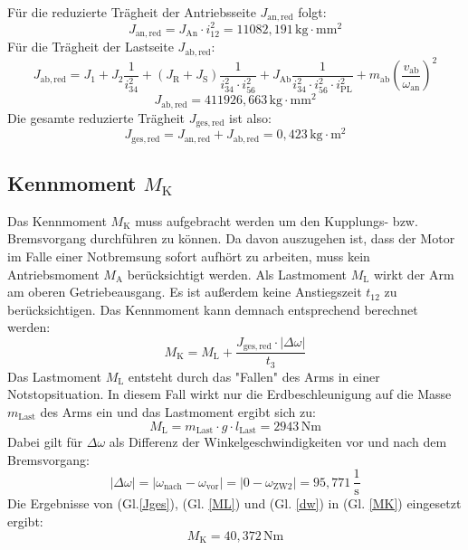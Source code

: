 \noindent
Für die reduzierte Trägheit der Antriebsseite $J_\mathrm{an,red}$ folgt: 
\begin{equation}
    J_\mathrm{an,red} = J_\mathrm{An}\cdot i_\mathrm{12}^2 = 11082,191\,\mathrm{kg\cdot mm^2}
\end{equation}
Für die Trägheit der Lastseite $J_\mathrm{ab,red}$:
\begin{equation}
    J_\mathrm{ab,red} = J_\mathrm{1} + J_\mathrm{2}\frac{1}{i_\mathrm{34}^2} + (J_\mathrm{R}+J_\mathrm{S})\frac{1}{i_\mathrm{34}^2 \cdot i_\mathrm{56}^2} + J_\mathrm{Ab}\frac{1}{i_\mathrm{34}^2 \cdot i_\mathrm{56}^2 \cdot i_\mathrm{PL}^2} + m_\mathrm{ab} \left( \frac{v_\mathrm{ab}}{\omega_\mathrm{an}} \right)^2
\end{equation}
\begin{equation*}
    J_\mathrm{ab,red} = 411926,663\,\mathrm{kg\cdot mm^2}
\end{equation*}
Die gesamte reduzierte Trägheit $J_\mathrm{ges,red}$ ist also:
\begin{equation} \label{Jges}
    J_\mathrm{ges,red} = J_\mathrm{an,red} + J_\mathrm{ab,red} = 0,423\,\mathrm{kg\cdot m^2}
\end{equation}

\subsection{Kennmoment $M_\mathrm{K}$}
Das Kennmoment $M_\mathrm{K}$ muss aufgebracht werden um den Kupplungs- bzw. Bremsvorgang durchführen zu können. Da davon auszugehen ist, dass der Motor im Falle einer Notbremsung sofort aufhört zu arbeiten, muss kein Antriebsmoment $M_\mathrm{A}$ berücksichtigt werden. Als Lastmoment $M_\mathrm{L}$ wirkt der Arm am oberen Getriebeausgang. Es ist außerdem keine Anstiegszeit $t_\mathrm{12}$ zu berücksichtigen. Das Kennmoment kann demnach entsprechend \cite[S. 13, Gl. 1]{VDI2241-1} berechnet werden:
\begin{equation} \label{MK}
    M_\mathrm{K} = M_\mathrm{L} + \frac{J_\mathrm{ges,red}\cdot |\Delta \omega|}{t_3}
\end{equation}
Das Lastmoment $M_\mathrm{L}$ entsteht durch das "Fallen" des Arms in einer Notstopsituation. In diesem Fall wirkt nur die Erdbeschleunigung auf die Masse $m_\mathrm{Last}$ des Arms ein und das Lastmoment ergibt sich zu:
\begin{equation} \label{ML}
    M_\mathrm{L} = m_\mathrm{Last} \cdot g \cdot l_\mathrm{Last} = 2943\,\mathrm{Nm}
\end{equation}
\noindent
Dabei gilt für $\Delta \omega$ als Differenz der Winkelgeschwindigkeiten vor und nach dem Bremsvorgang:
\begin{equation} \label{dw}
    |\Delta \omega| = |\omega_\mathrm{nach} - \omega_\mathrm{vor}| = |0 - \omega_\mathrm{ZW2}| = 95,771\,\mathrm{\frac{1}{s}} 
\end{equation}
Die Ergebnisse von (Gl.\ref{Jges}), (Gl. \ref{ML}) und (Gl. \ref{dw}) in (Gl. \ref{MK}) eingesetzt ergibt:
\begin{equation}
    M_\mathrm{K} = 40,372\,\mathrm{Nm}
\end{equation}






